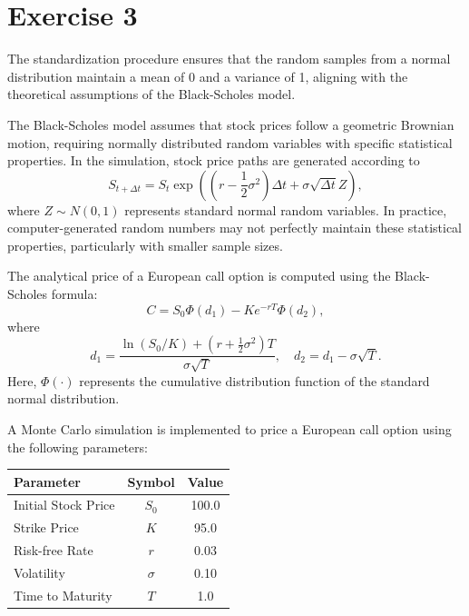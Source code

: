 \section{Exercise 3}

The standardization procedure ensures that the random samples from a normal distribution maintain a mean of 0 and a variance of 1, aligning with the theoretical assumptions of the Black-Scholes model.

The Black-Scholes model assumes that stock prices follow a geometric Brownian motion, requiring normally distributed random variables with specific statistical properties. In the simulation, stock price paths are generated according to
\begin{equation}
    S_{t+\Delta t} = S_t \exp\left((r - \frac{1}{2}\sigma^2)\Delta t + \sigma\sqrt{\Delta t}Z\right),
\end{equation}
where $Z \sim N(0,1)$ represents standard normal random variables. In practice, computer-generated random numbers may not perfectly maintain these statistical properties, particularly with smaller sample sizes.

The analytical price of a European call option is computed using the Black-Scholes formula:
\begin{equation}
    C = S_0 \Phi(d_1) - K e^{-rT} \Phi(d_2),
\end{equation}
where
\begin{equation}
    d_1 = \frac{\ln(S_0 / K) + (r + \frac{1}{2} \sigma^2)T}{\sigma \sqrt{T}}, \quad d_2 = d_1 - \sigma \sqrt{T}.
\end{equation}
Here, $\Phi(\cdot)$ represents the cumulative distribution function of the standard normal distribution.

A Monte Carlo simulation is implemented to price a European call option using the following parameters:

\begin{center}
    \begin{tabular}{l c c}
        \toprule
        Parameter & Symbol & Value \\
        \midrule
        Initial Stock Price & $S_0$ & 100.0 \\
        Strike Price & $K$ & 95.0 \\
        Risk-free Rate & $r$ & 0.03 \\
        Volatility & $\sigma$ & 0.10 \\
        Time to Maturity & $T$ & 1.0 \\
        \bottomrule
    \end{tabular}
\end{center}

